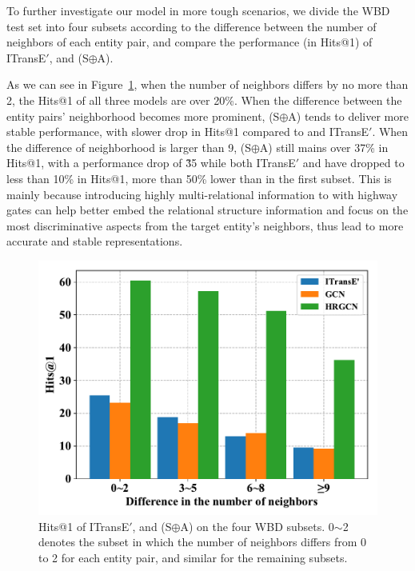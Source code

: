 To further investigate our model in more tough scenarios, %
we divide the WBD test set into four subsets according to the difference between the number of neighbors of each entity pair, and compare the performance (in Hits@1) of ITransE$'$, \GCN and \HRGCN (S$\oplus$A). %

As we can see in Figure~\ref{subset}, when the number of neighbors differs by no more than 2, the Hits@1 of all three models are over 20\%.
When the difference between the entity pairs' neighborhood becomes more prominent,
\HRGCN (S$\oplus$A) tends to deliver more stable performance, with slower drop in  Hits@1 compared to \GCN and ITransE$'$.
When the difference of neighborhood is larger than 9,  \HRGCN (S$\oplus$A) still mains over 37\% in Hits@1, with a performance drop of \~35%
while both ITransE$'$ and \GCN have dropped to less than 10\% in  Hits@1, more than 50\% lower than in the first subset.
This is mainly because introducing highly multi-relational information to \GCN with highway gates can help better embed the relational structure information and focus on the most discriminative aspects from the target entity's neighbors, thus lead to more accurate and stable representations.
\begin{figure}
	\centering
	\includegraphics[width=1\linewidth]{figures/graph4.pdf}
	\caption{Hits@1 of ITransE$'$, \GCN and \HRGCN (S$\oplus$A) on the four WBD subsets. 0$\sim$2 denotes the subset in which the number of neighbors differs from 0 to 2 for each entity pair, and similar for the remaining subsets.}
	\label{subset}
\end{figure}

